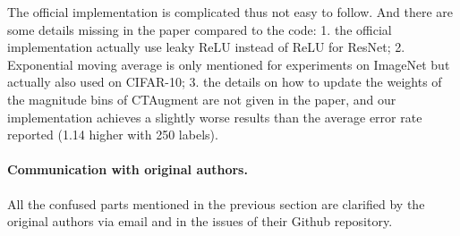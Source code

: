 The official implementation is complicated thus not easy to follow. And there are some details missing in the paper compared to the code: 1. the official implementation actually use leaky ReLU instead of ReLU for ResNet; 2. Exponential moving average is only mentioned for experiments on ImageNet but actually also used on CIFAR-10; 3. the details on how to update the weights of the magnitude bins of CTAugment are not given in the paper, and our implementation achieves a slightly worse results than the average error rate reported (1.14 higher with 250 labels).



\paragraph{Communication with original authors.}
All the confused parts mentioned in the previous section are clarified by the original authors via email and in the issues of their Github repository.

